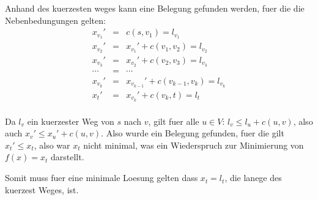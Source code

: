 Anhand des kuerzesten weges kann eine Belegung gefunden werden, fuer die die Nebenbedungungen gelten: 
\begin{eqnarray}
    x_{v_1}' &=& c(s,v_1) = l_{v_1}\\
    x_{v_2}' &=& x_{v_1}' + c(v_1,v_2) = l_{v_2}\\
    x_{v_3}' &=& x_{v_2}' + c(v_2,v_3) = l_{v_3}\\
    \cdots  &=&  \cdots\\
    x_{v_k}' &=& x_{v_{k-1}}' + c(v_{k-1},v_k) = l_{v_k}\\
    x_t' &=&  x_{v_k}' + c(v_{k}, t) = l_t\\
\end{eqnarray}

Da $l_v$ ein kuerzester Weg von $s$ nach $v$, gilt fuer alle $u \in V$: $l_v \leq l_u + c(u,v)$, 
also auch $x_v' \leq x_u' + c(u,v)$. Also wurde ein Belegung gefunden, fuer die gilt
$x_t' \leq x_t$, also war $x_t$ nicht minimal, was ein Wiederspruch zur Minimierung von $f(x) = x_t$ darstellt.

Somit muss fuer eine minimale Loesung gelten dass $x_t = l_t$, die lanege des kuerzest Weges, ist.


